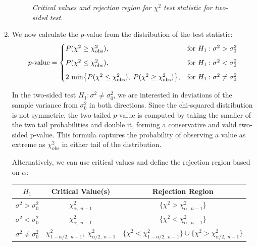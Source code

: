 \documentclass[twoside]{book}
\begin{document}
\begin{enumerate}
\begin{figure}[H]
\begin{center}
			\caption{\textit{Critical values and rejection region for $\chi^2$ test statistic for two-sided test}.}
		\end{center}
	\end{figure}

	\item We now calculate the \(p\)-value from the distribution of the test statistic:
	\[
	p\text{-value} =
	\begin{cases}
	P(\chi^2 \ge \chi^2_{\rm obs}), & \text{for } H_1: \sigma^2 > \sigma_0^2 \\[6pt]
	P(\chi^2 \le \chi^2_{\rm obs}), & \text{for } H_1: \sigma^2 < \sigma_0^2 \\[6pt]
	2\,\min\bigl\{P(\chi^2 \le \chi^2_{\rm obs}),\; P(\chi^2 \ge \chi^2_{\rm obs})\bigr\}, & \text{for } H_1: \sigma^2 \neq \sigma_0^2
	\end{cases}
	\]

	In the two-sided test \( H_1: \sigma^2 \neq \sigma_0^2 \), we are interested in deviations of the sample variance from \( \sigma_0^2 \) in both directions. Since the chi-squared distribution is not symmetric, the two-tailed \( p \)-value is computed by taking the smaller of the two tail probabilities and double it, forming a conservative and valid two-sided p-value.
	This formula captures the probability of observing a value as extreme as \( \chi^2_{\text{obs}} \) in either tail of the distribution.

	Alternatively, we can use critical values and define the rejection region based on \(\alpha\):
	\begin{table}[H]
		\centering
		\begin{tabular}{@{}c|c|c@{}}
			\toprule
			\textbf{$H_1$} & \textbf{Critical Value(s)} & \textbf{Rejection Region} \\
			\midrule
			$\sigma^2 > \sigma_0^2$ & $\chi^2_{\alpha,\; n-1}$ &
			\(\{\chi^2 > \chi^2_{\alpha,\; n-1}\}\) \\[6pt]
			$\sigma^2 < \sigma_0^2$ &
			$\chi^2_{\alpha,\; n-1}$ &
			\(\{\chi^2 < \chi^2_{\alpha,\; n-1}\}\) \\[6pt]
			$\sigma^2 \neq \sigma_0^2$ &
			$\chi^2_{1-\alpha/2,\; n-1},\; \chi^2_{\alpha/2,\; n-1}$ &
			\(\{\chi^2 < \chi^2_{1-\alpha/2,\; n-1}\} \cup \{\chi^2 > \chi^2_{\alpha/2,\; n-1}\}\) \\
			\bottomrule
		\end{tabular}
	\end{table}


\end{enumerate}
\end{document}
